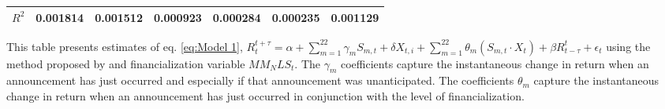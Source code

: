 \begin{sidewaystable}
{\begin{tabular}{@{}lllllllllllll@{}}
\textbf{$R^2$}             &\multicolumn{2}{c}{ 0.001814 }                                                 & \multicolumn{2}{c}{ 0.001512 }                                                 & \multicolumn{2}{c}{ 0.000923 }                                                 & \multicolumn{2}{c}{ 0.000284 }                                                 & \multicolumn{2}{c}{ 0.000235 }                                                   & \multicolumn{2}{c}{ 0.001129 }                                                 \\ \bottomrule 
\end{tabular}
}
\begin{tablenotes}\item 
    \singlespacing
    \footnotesize
    This table presents estimates of eq. \ref{eq:Model 1}, $R_{t}^{t+\tau}=\alpha+\sum_{m=1}^{22} \gamma_m S_{m,t}+ \delta X_{t,i} + \sum_{m=1}^{22} \theta_m (S_{m,t} \cdot X_t)+\beta R_{t-\tau}^{t}+\epsilon_{t}$ using the method proposed by \citet{kurov2019price} and financialization variable $MM_NLS_t$. The $\gamma_m$ coefficients capture the instantaneous change in return when an announcement has just occurred and especially if that announcement was unanticipated. The coefficients $\theta_m$ capture the instantaneous change in return when an announcement has just occurred in conjunction with the level of financialization.
\end{tablenotes}
\end{sidewaystable}


